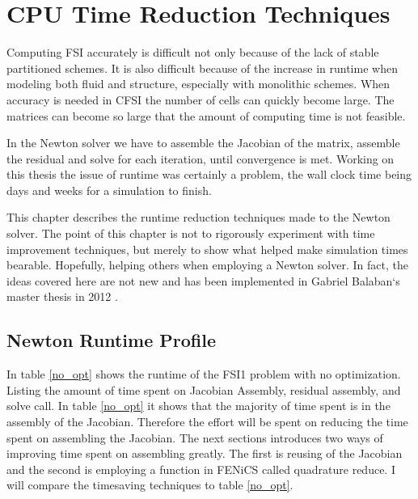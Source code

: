 \chapter{CPU Time Reduction Techniques}\label{runtime}
Computing FSI accurately is difficult not only because of the lack of stable partitioned schemes. It is also difficult because of the increase in runtime when modeling both fluid and structure, especially with monolithic schemes. When accuracy is needed in CFSI the number of cells can quickly become large. The matrices can become so large that the amount of computing time is not feasible.

In the Newton solver we have to assemble the Jacobian of the matrix, assemble the residual and solve for each iteration, until convergence is met. Working on this thesis the issue of runtime was certainly a problem, the wall clock time being days and weeks for a simulation to finish. 

This chapter describes the runtime reduction techniques made to the Newton solver. The point of this chapter is not to rigorously experiment with time improvement techniques, but merely to show what helped make simulation times bearable. Hopefully, helping others when employing a Newton solver. In fact, the ideas covered here are not new and has been implemented in Gabriel Balaban`s master thesis in 2012 \cite{Sciences2012}.

\section{Newton Runtime Profile}
In table \ref{no_opt} shows the runtime of the  FSI1 problem with no optimization. Listing the amount of time spent on Jacobian Assembly, residual assembly, and solve call. 
In table \ref{no_opt} it shows that the majority of time spent is in the assembly of the Jacobian. Therefore the effort will be spent on reducing the time spent on assembling the Jacobian. The next sections introduces two ways of improving time spent on assembling greatly. The first is reusing of the Jacobian and the second is employing a function in FENiCS called quadrature reduce. I will compare the timesaving techniques to table \ref{no_opt}.

